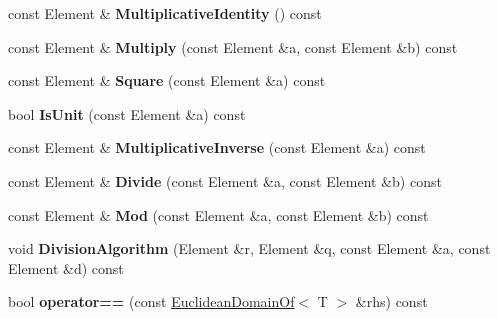 \begin{DoxyCompactItemize}
\item 
\hypertarget{class_euclidean_domain_of_a96b4cd14ea7dd94ed448091eafc0e987}{
const Element \& {\bfseries MultiplicativeIdentity} () const }
\label{class_euclidean_domain_of_a96b4cd14ea7dd94ed448091eafc0e987}

\item 
\hypertarget{class_euclidean_domain_of_a838df0bdf681e17b2d9739218055f77d}{
const Element \& {\bfseries Multiply} (const Element \&a, const Element \&b) const }
\label{class_euclidean_domain_of_a838df0bdf681e17b2d9739218055f77d}

\item 
\hypertarget{class_euclidean_domain_of_abbca8e162fa458ea0c3298ec93bbc785}{
const Element \& {\bfseries Square} (const Element \&a) const }
\label{class_euclidean_domain_of_abbca8e162fa458ea0c3298ec93bbc785}

\item 
\hypertarget{class_euclidean_domain_of_acc11a9230a2d95b1f9bf7881abcfa58e}{
bool {\bfseries IsUnit} (const Element \&a) const }
\label{class_euclidean_domain_of_acc11a9230a2d95b1f9bf7881abcfa58e}

\item 
\hypertarget{class_euclidean_domain_of_a1799ba37ef6df348c1c03f26662a48dd}{
const Element \& {\bfseries MultiplicativeInverse} (const Element \&a) const }
\label{class_euclidean_domain_of_a1799ba37ef6df348c1c03f26662a48dd}

\item 
\hypertarget{class_euclidean_domain_of_adec4df9559c0c1e606ab8640fa4375cd}{
const Element \& {\bfseries Divide} (const Element \&a, const Element \&b) const }
\label{class_euclidean_domain_of_adec4df9559c0c1e606ab8640fa4375cd}

\item 
\hypertarget{class_euclidean_domain_of_a9a984ecc864048eca647219f0cca2107}{
const Element \& {\bfseries Mod} (const Element \&a, const Element \&b) const }
\label{class_euclidean_domain_of_a9a984ecc864048eca647219f0cca2107}

\item 
\hypertarget{class_euclidean_domain_of_ad6f863dee17427103f777e1965f2eb63}{
void {\bfseries DivisionAlgorithm} (Element \&r, Element \&q, const Element \&a, const Element \&d) const }
\label{class_euclidean_domain_of_ad6f863dee17427103f777e1965f2eb63}

\item 
\hypertarget{class_euclidean_domain_of_ac362f13502c9fcd46495e184088039fe}{
bool {\bfseries operator==} (const \hyperlink{class_euclidean_domain_of}{EuclideanDomainOf}$<$ T $>$ \&rhs) const }
\label{class_euclidean_domain_of_ac362f13502c9fcd46495e184088039fe}

\end{DoxyCompactItemize}


